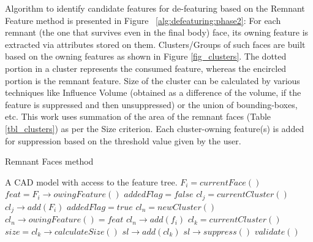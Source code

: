Algorithm to identify candidate features for de-featuring based on the Remnant Feature method is presented in Figure ~\ref{alg:defeaturing:phase2}:
For each remnant (the one that survives even in the final body) face, its owning feature is extracted via attributes stored on them. Clusters/Groups of such faces are built based on the owning features as shown in Figure  \ref{fig_clusters}. The dotted portion in a cluster represents the consumed feature, whereas the encircled portion is the remnant feature. Size of the cluster can be calculated by various techniques like Influence Volume (obtained as a difference of the volume, if the feature is suppressed and then unsuppressed) or the union of bounding-boxes, etc. This work uses summation of the area of the remnant faces (Table \ref{tbl_clusters}) as per the Size criterion. Each cluster-owning feature(s) is added for suppression based on the threshold value given by the user.

\begin{algorithm}[!tbh]
	\caption{Remnant Faces method}
	\label{alg:defeaturing:phase2}
	\begin{algorithmic}
		\REQUIRE A CAD model with access to the feature tree. 
			\STATE $F_i = currentFace()$
			\STATE $feat = F_i \rightarrow owingFeature()$
			\STATE $addedFlag = false$
				\STATE $cl_j = currentCluster()$
					\STATE  $cl_j \rightarrow add(F_i)$
					\STATE $addedFlag = true$
				\ENDIF
			\ENDWHILE
				\STATE  $cl_n = newCluster()$
				\STATE  $cl_n \rightarrow owingFeature() = feat$
				\STATE  $cl_n \rightarrow add(f_i)$
			\ENDIF
		\ENDWHILE
			\STATE $cl_k = currentCluster()$
			\STATE $size = cl_k \rightarrow calculateSize()$
				\STATE   $sl \rightarrow add(cl_k)$
			\ENDIF			
		\ENDWHILE
		\STATE  $sl \rightarrow suppress()$
		\STATE  $validate()$
	\end{algorithmic}
\end{algorithm}

